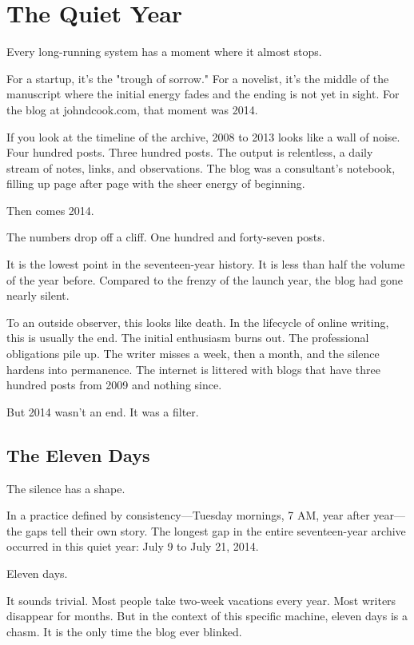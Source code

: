 \chapter{The Quiet Year}

Every long-running system has a moment where it almost stops.

For a startup, it’s the "trough of sorrow." For a novelist, it’s the middle of the manuscript where the initial energy fades and the ending is not yet in sight. For the blog at johndcook.com, that moment was 2014.

If you look at the timeline of the archive, 2008 to 2013 looks like a wall of noise. Four hundred posts. Three hundred posts. The output is relentless, a daily stream of notes, links, and observations. The blog was a consultant’s notebook, filling up page after page with the sheer energy of beginning.

Then comes 2014.

The numbers drop off a cliff. One hundred and forty-seven posts.

It is the lowest point in the seventeen-year history. It is less than half the volume of the year before. Compared to the frenzy of the launch year, the blog had gone nearly silent.

To an outside observer, this looks like death. In the lifecycle of online writing, this is usually the end. The initial enthusiasm burns out. The professional obligations pile up. The writer misses a week, then a month, and the silence hardens into permanence. The internet is littered with blogs that have three hundred posts from 2009 and nothing since.

But 2014 wasn't an end. It was a filter.

\bigskip

\section*{The Eleven Days}

The silence has a shape.

In a practice defined by consistency---Tuesday mornings, 7 AM, year after year---the gaps tell their own story. The longest gap in the entire seventeen-year archive occurred in this quiet year: July 9 to July 21, 2014.

Eleven days.

It sounds trivial. Most people take two-week vacations every year. Most writers disappear for months. But in the context of this specific machine, eleven days is a chasm. It is the only time the blog ever blinked.

